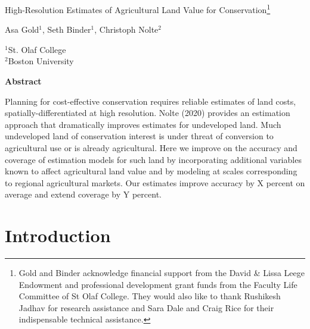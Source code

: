 \documentclass[12pt]{article}
\begin{document}
\hspace{5pt}

\Large
 \begin{center}
High-Resolution Estimates of Agricultural Land Value for Conservation\footnote[2]{Gold and Binder acknowledge financial support from the David \& Lissa Leege Endowment and professional development grant funds from the Faculty Life Committee of St Olaf College. They would also like to thank Rushikesh Jadhav for research assistance and Sara Dale and Craig Rice for their indispensable technical assistance.}\\ 

\vspace{10pt}

\large
Asa Gold$^1$, Seth Binder$^1$, Christoph Nolte$^2$ \\

\vspace{10pt}

\footnotesize  
$^{1}$St. Olaf College\\
$^2$Boston University

\vspace{40pt} 

    \normalsize
    \textbf{Abstract}
\end{center}

\small
Planning for cost-effective conservation requires reliable estimates of land costs, spatially-differentiated at high resolution. Nolte (2020) provides an estimation approach that dramatically improves estimates for undeveloped land. Much undeveloped land of conservation interest is under threat of conversion to agricultural use or is already agricultural. Here we improve on the accuracy and coverage of estimation models for such land by incorporating additional variables known to affect agricultural land value and by modeling at scales corresponding to regional agricultural markets. Our estimates improve accuracy by X percent on average and extend coverage by Y percent. 

\newpage

\section{Introduction}
\end{document}
